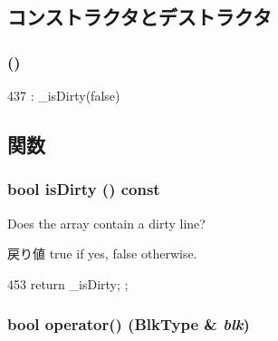 \subsection{コンストラクタとデストラクタ}
\hypertarget{classCacheBlkIsDirtyVisitor_ab3642c3ba67d65228f3b7e704f3ec1c8}{
\subsubsection[{CacheBlkIsDirtyVisitor}]{ ()}}
\label{classCacheBlkIsDirtyVisitor_ab3642c3ba67d65228f3b7e704f3ec1c8}



\begin{DoxyCode}
437         : _isDirty(false) {}
\end{DoxyCode}


\subsection{関数}
\hypertarget{classCacheBlkIsDirtyVisitor_ad66f409af3c387e166ff7ee95169b7b6}{
\subsubsection[{isDirty}]{\setlength{\rightskip}{0pt plus 5cm}bool isDirty () const}}
\label{classCacheBlkIsDirtyVisitor_ad66f409af3c387e166ff7ee95169b7b6}
Does the array contain a dirty line?

\begin{DoxyReturn}{戻り値}
true if yes, false otherwise. 
\end{DoxyReturn}



\begin{DoxyCode}
453 { return _isDirty; };
\end{DoxyCode}
\hypertarget{classCacheBlkIsDirtyVisitor_af8429f9c21cde9e60c7fe57e0f14a0ef}{
\subsubsection[{operator()}]{\setlength{\rightskip}{0pt plus 5cm}bool operator() (BlkType \& {\em blk})}}
\label{classCacheBlkIsDirtyVisitor_af8429f9c21cde9e60c7fe57e0f14a0ef}



